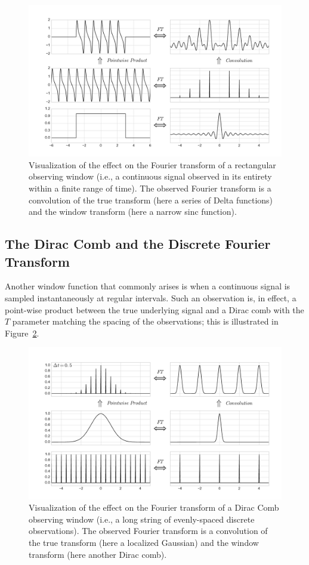 \documentclass[preprint]{aastex}
\newcommand{\fig}[1]{Figure~\ref{fig:#1}}
\newcommand{\figlabel}[1]{\label{fig:#1}}
\begin{document}
\begin{figure}[ht]
  \centering
  \includegraphics[width=\textwidth]{fig06_Rectangular_Window}
  \caption{Visualization of the effect on the Fourier transform of a
    rectangular observing window (i.e., a continuous signal observed in its
    entirety within a finite range of time). The observed Fourier
    transform is a convolution of the true transform (here a series of Delta
    functions) and the window transform (here a narrow sinc function).
    \figlabel{rectangular-window}}
\end{figure}

\subsection{The Dirac Comb and the Discrete Fourier Transform}
Another window function that commonly arises is when a continuous signal is
sampled instantaneously at regular intervals.
Such an observation is, in effect, a point-wise product between the true
underlying signal and a Dirac comb with the $T$ parameter matching the spacing
of the observations; this is illustrated in \fig{comb-window-1}.

\begin{figure}[ht]
  \centering
  \includegraphics[width=\textwidth]{fig07_comb_window_1}
  \caption{Visualization of the effect on the Fourier transform of a
    Dirac Comb observing window (i.e., a long string of evenly-spaced
    discrete observations). The observed Fourier
    transform is a convolution of the true transform (here a localized
    Gaussian) and the window transform (here another Dirac comb).
    \figlabel{comb-window-1}}
\end{figure}
\end{document}
